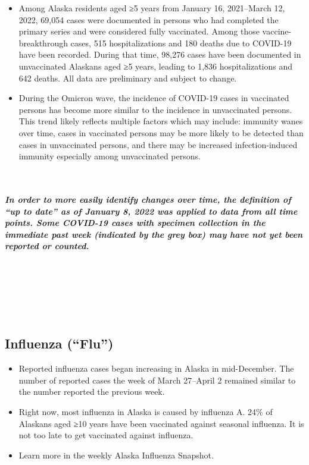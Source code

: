 \documentclass[
]{article}
\begin{document}
\begin{itemize}
\item
  Among Alaska residents aged ≥5 years from January 16, 2021--March 12,
  2022, 69,054 cases were documented in persons who had completed the
  primary series and were considered fully vaccinated. Among those
  vaccine-breakthrough cases, 515 hospitalizations and 180 deaths due to
  COVID-19 have been recorded. During that time, 98,276 cases have been
  documented in unvaccinated Alaskans aged ≥5 years, leading to 1,836
  hospitalizations and 642 deaths. All data are preliminary and subject
  to change.
\item
  During the Omicron wave, the incidence of COVID-19 cases in vaccinated
  persons has become more similar to the incidence in unvaccinated
  persons. This trend likely reflects multiple factors which may
  include: immunity wanes over time, cases in vaccinated persons may be
  more likely to be detected than cases in unvaccinated persons, and
  there may be increased infection-induced immunity especially among
  unvaccinated persons.
\end{itemize}

~

\hypertarget{in-order-to-more-easily-identify-changes-over-time-the-definition-of-up-to-date-as-of-january-8-2022-was-applied-to-data-from-all-time-points.-some-covid-19-cases-with-specimen-collection-in-the-immediate-past-week-indicated-by-the-grey-box-may-have-not-yet-been-reported-or-counted.}{%
\subparagraph{In order to more easily identify changes over time, the
definition of ``up to date'' as of January 8, 2022 was applied to data
from all time points. Some COVID-19 cases with specimen collection in
the immediate past week (indicated by the grey box) may have not yet
been reported or
counted.}\label{in-order-to-more-easily-identify-changes-over-time-the-definition-of-up-to-date-as-of-january-8-2022-was-applied-to-data-from-all-time-points.-some-covid-19-cases-with-specimen-collection-in-the-immediate-past-week-indicated-by-the-grey-box-may-have-not-yet-been-reported-or-counted.}}

~

~

~

\hypertarget{influenza-flu}{%
\subsection{Influenza (``Flu'')}\label{influenza-flu}}

\begin{itemize}
\item
  Reported influenza cases began increasing in Alaska in mid-December.
  The number of reported cases the week of March 27--April 2 remained
  similar to the number reported the previous week.
\item
  Right now, most influenza in Alaska is caused by influenza A. 24\% of
  Alaskans aged ≥10 years have been vaccinated against seasonal
  influenza. It is not too late to get vaccinated against influenza.
\item
  Learn more in the weekly Alaska Influenza Snapshot.
\end{itemize}
\end{document}
